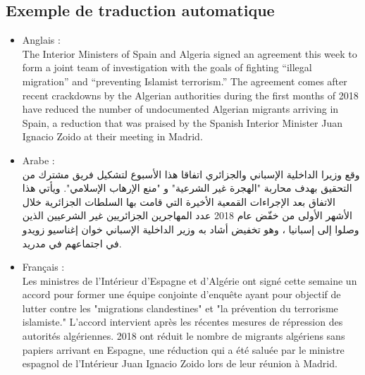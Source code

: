     \subsection{Exemple de traduction automatique}
    \begin{itemize}
        \item Anglais :\\ 
        \textquotedbl The Interior Ministers of Spain and Algeria signed an agreement this week to form a joint team of investigation with the goals of fighting “illegal migration” and “preventing Islamist terrorism.” The agreement comes after recent crackdowns by the Algerian authorities during the first months of 2018 have reduced the number of undocumented Algerian migrants arriving in Spain, a reduction that was praised by the Spanish Interior Minister Juan Ignacio Zoido at their meeting in Madrid.\textquotedbl \\
        
        \item Arabe :\\
        \textquotedbl وقع وزيرا الداخلية الإسباني والجزائري اتفاقا هذا الأسبوع لتشكيل فريق مشترك من التحقيق بهدف محاربة "الهجرة غير الشرعية" و "منع الإرهاب الإسلامي". ويأتي هذا الاتفاق بعد الإجراءات القمعية الأخيرة التي قامت بها السلطات الجزائرية خلال الأشهر الأولى من خفّض عام 2018 عدد المهاجرين الجزائريين غير الشرعيين الذين وصلوا إلى إسبانيا ، وهو تخفيض أشاد به وزير الداخلية الإسباني خوان إغناسيو زويدو في اجتماعهم في مدريد. \textquotedbl
    
        \item Français :\\
        \textquotedbl Les ministres de l'Intérieur d'Espagne et d'Algérie ont signé cette semaine un accord pour former une équipe conjointe d'enquête ayant pour objectif de lutter contre les "migrations clandestines" et "la prévention du terrorisme islamiste." L'accord intervient après les récentes mesures de répression des autorités algériennes. 2018 ont réduit le nombre de migrants algériens sans papiers arrivant en Espagne, une réduction qui a été saluée par le ministre espagnol de l'Intérieur Juan Ignacio Zoido lors de leur réunion à Madrid.\textquotedbl \\

   \end{itemize}
